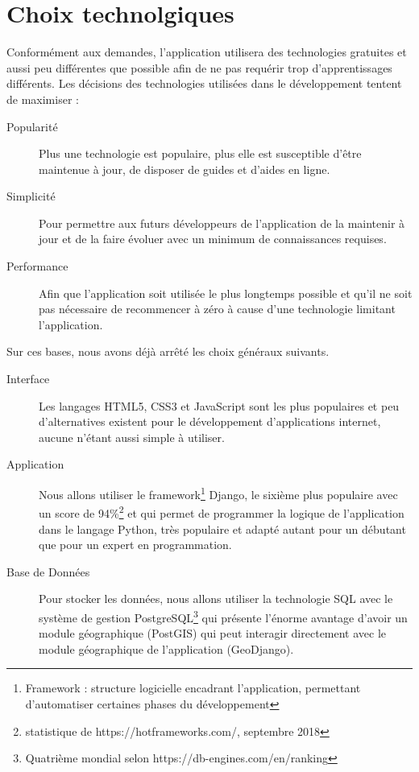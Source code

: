 \documentclass[a4paper, 11pt]{article}
\begin{document}
\section{Choix technolgiques}
  Conformément aux demandes, l'application utilisera des technologies gratuites et aussi peu différentes que possible afin de ne pas requérir trop d'apprentissages différents. Les décisions des technologies utilisées dans le développement tentent de maximiser :
  \begin{description}
    \item[Popularité] Plus une technologie est populaire, plus elle est susceptible d'être maintenue à jour, de disposer de guides et d'aides en ligne.
    \item[Simplicité] Pour permettre aux futurs développeurs de l'application de la maintenir à jour et de la faire évoluer avec un minimum de connaissances requises.
    \item[Performance] Afin que l'application soit utilisée le plus longtemps possible et qu'il ne soit pas nécessaire de recommencer à zéro à cause d'une technologie limitant l'application.
  \end{description}

  Sur ces bases, nous avons déjà arrêté les choix généraux suivants.
  \begin{description}
    \item[Interface] Les langages HTML5, CSS3 et JavaScript sont les plus populaires et peu d'alternatives existent pour le développement d'applications internet, aucune n'étant aussi simple à utiliser.
    \item[Application] Nous allons utiliser le framework\footnote{Framework : structure logicielle encadrant l'application, permettant d'automatiser certaines phases du développement} Django, le sixième plus populaire avec un score de 94\%\footnote{statistique de https://hotframeworks.com/, septembre 2018} et qui permet de programmer la logique de l'application dans le langage Python, très populaire et adapté autant pour un débutant que pour un expert en programmation.
    \item[Base de Données] Pour stocker les données, nous allons utiliser la technologie SQL avec le système de gestion PostgreSQL\footnote{Quatrième mondial selon https://db-engines.com/en/ranking} qui présente l'énorme avantage d'avoir un module géographique (PostGIS) qui peut interagir directement avec le module géographique de l'application (GeoDjango).
  \end{description}
\end{document}
